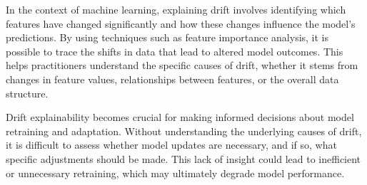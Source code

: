 In the context of machine learning, explaining drift involves identifying which
features have changed significantly and how these changes influence the model's
predictions. By using techniques such as feature importance analysis, it is
possible to trace the shifts in data that lead to altered model outcomes. This
helps practitioners understand the specific causes of drift, whether it stems
from changes in feature values, relationships between features, or the overall
data structure.

Drift explainability becomes crucial for making informed decisions about model
retraining and adaptation. Without understanding the underlying causes of
drift, it is difficult to assess whether model updates are necessary, and if
so, what specific adjustments should be made. This lack of insight could lead
to inefficient or unnecessary retraining, which may ultimately degrade model
performance.